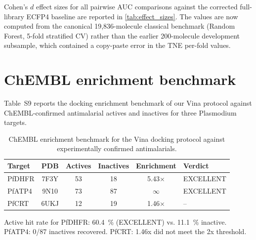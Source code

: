 \documentclass[11pt,a4paper]{article}
\begin{document}
Cohen's $d$ effect sizes for all pairwise AUC comparisons against the corrected full-library ECFP4 baseline are reported in \cref{tab:effect_sizes}. The values are now computed from the canonical 19,836-molecule classical benchmark (Random Forest, 5-fold stratified CV) rather than the earlier 200-molecule development subsample, which contained a copy-paste error in the TNE per-fold values.





\section{ChEMBL enrichment benchmark}
\label{sec:chembl_enrichment}

Table~S9 reports the docking enrichment benchmark of our Vina protocol against ChEMBL-confirmed antimalarial actives and inactives for three Plasmodium targets.

\begin{table}[htbp]
\centering
\caption{ChEMBL enrichment benchmark for the Vina docking protocol against experimentally confirmed antimalarials.}
\label{tab:chembl_enrichment}
\begin{tabularx}{\textwidth}{l c c c c l}
\toprule
Target & PDB & {Actives} & {Inactives} & {Enrichment} & Verdict \\
\midrule
PfDHFR & 7F3Y & 53 & 18 & 5.43$\times$ & EXCELLENT \\
PfATP4 & 9N10 & 73 & 87 & $\infty$ & EXCELLENT \\
PfCRT & 6UKJ & 12 & 19 & 1.46$\times$ & -- \\
\bottomrule
\end{tabularx}
\vspace{1mm}
\footnotesize Active hit rate for PfDHFR: \qty{60.4}{\percent} (EXCELLENT) vs. \qty{11.1}{\percent} inactive. PfATP4: 0/87 inactives recovered. PfCRT: 1.46x did not meet the 2x threshold.
\end{table}



\end{document}
